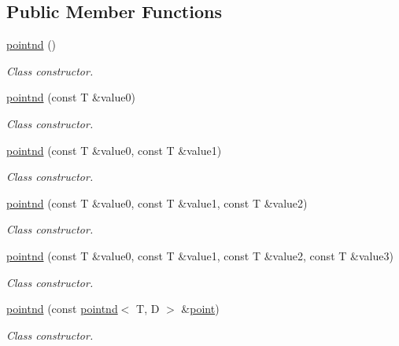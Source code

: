 \subsection*{Public Member Functions}
\begin{DoxyCompactItemize}
\item 
\mbox{\label{classacme_1_1pointnd_a284231947c22b4796ab74878d257160e}} 
\hyperlink{classacme_1_1pointnd_a284231947c22b4796ab74878d257160e}{pointnd} ()
\begin{DoxyCompactList}\small\item\em Class constructor. \end{DoxyCompactList}\item 
\hyperlink{classacme_1_1pointnd_aeabd8c2c9028247e3f92362755aa9806}{pointnd} (const T \&value0)
\begin{DoxyCompactList}\small\item\em Class constructor. \end{DoxyCompactList}\item 
\hyperlink{classacme_1_1pointnd_a44a24023bae0c265fa59db90003ff916}{pointnd} (const T \&value0, const T \&value1)
\begin{DoxyCompactList}\small\item\em Class constructor. \end{DoxyCompactList}\item 
\hyperlink{classacme_1_1pointnd_aac9ecea0a96f3b6d9a9e3b39066785d2}{pointnd} (const T \&value0, const T \&value1, const T \&value2)
\begin{DoxyCompactList}\small\item\em Class constructor. \end{DoxyCompactList}\item 
\hyperlink{classacme_1_1pointnd_aec3e1e45adcfc4e6094fcb46c454708a}{pointnd} (const T \&value0, const T \&value1, const T \&value2, const T \&value3)
\begin{DoxyCompactList}\small\item\em Class constructor. \end{DoxyCompactList}\item 
\hyperlink{classacme_1_1pointnd_a70c00125fb976462a993f2edfc06870d}{pointnd} (const \hyperlink{classacme_1_1pointnd}{pointnd}$<$ T, D $>$ \&\hyperlink{classacme_1_1point}{point})
\begin{DoxyCompactList}\small\item\em Class constructor. \end{DoxyCompactList}\item 

\end{DoxyCompactItemize}
